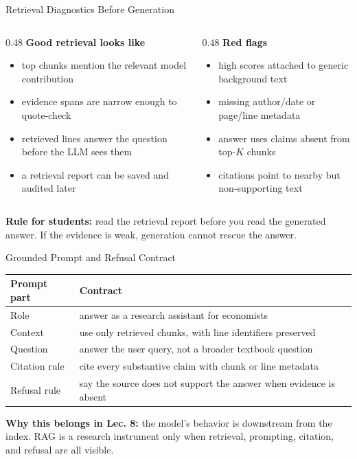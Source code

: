 \begin{frame}{Retrieval Diagnostics Before Generation}
\begin{columns}[T]
\begin{column}{0.48\textwidth}
\textbf{Good retrieval looks like}
\begin{itemize}\small
  \item top chunks mention the relevant model contribution
  \item evidence spans are narrow enough to quote-check
  \item retrieved lines answer the question before the LLM sees them
  \item a retrieval report can be saved and audited later
\end{itemize}
\end{column}
\begin{column}{0.48\textwidth}
\textbf{Red flags}
\begin{itemize}\small
  \item high scores attached to generic background text
  \item missing author/date or page/line metadata
  \item answer uses claims absent from top-$K$ chunks
  \item citations point to nearby but non-supporting text
\end{itemize}
\end{column}
\end{columns}

\vspace{0.25cm}
\textbf{Rule for students:} read the retrieval report before you read the generated answer. If the evidence is weak, generation cannot rescue the answer.
\end{frame}

\begin{frame}{Grounded Prompt and Refusal Contract}
\small
\begin{tabular}{p{2.9cm}p{8.7cm}}
\toprule
\textbf{Prompt part} & \textbf{Contract} \\
\midrule
Role & answer as a research assistant for economists \\
Context & use only retrieved chunks, with line identifiers preserved \\
Question & answer the user query, not a broader textbook question \\
Citation rule & cite every substantive claim with chunk or line metadata \\
Refusal rule & say the source does not support the answer when evidence is absent \\
\bottomrule
\end{tabular}

\vspace{0.3cm}
\begin{takeawaybox}
\textbf{Why this belongs in Lec. 8:} the model's behavior is downstream from the index. RAG is a research instrument only when retrieval, prompting, citation, and refusal are all visible.
\end{takeawaybox}
\end{frame}


